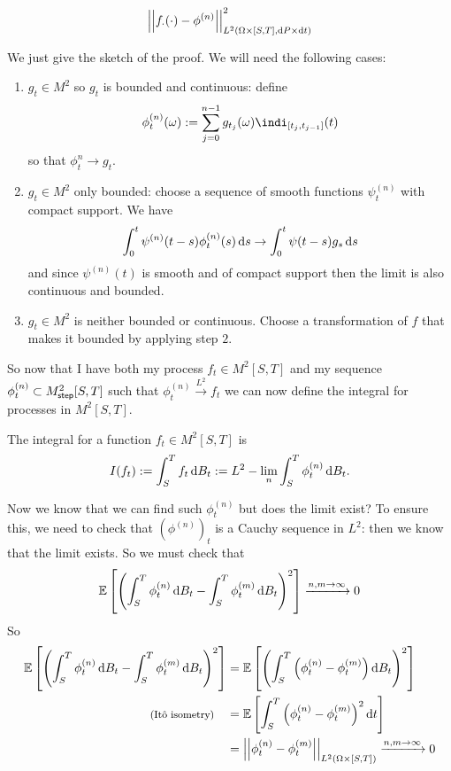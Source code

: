 \documentclass[12pt]{report}
\begin{document}
\begin{equation*}
	\norm{f_{\cdot}(\cdot)-\phi^{(n)}}^{2}_{L^{2}(\Omega\times[S,T],\dif P\times\dt)}
\end{equation*}
\begin{fancyproof}
	We just give the sketch of the proof. We will need the following cases:
	\begin{enumerate}[\circnum]
		\item $g_{t}\in M^{2}$ so $g_{t}$ is bounded and continuous: define
		\begin{equation*}
			\phi^{(n)}_{t}(\omega):=\sum_{j=0}^{n-1}g_{t_{j}}(\omega)\indi_{[t_{j},t_{j-1}]}(t)
		\end{equation*}
		so that $\phi_{t}^{n}\to g_{t}$.
		\item $g_{t}\in M^{2}$ only bounded: choose a sequence of smooth functions $\psi^{(n)}_{t}$ with compact support. We have
		\begin{equation*}
			\int_{0}^{t}\psi^{(n)}(t-s)\phi^{(n)}_{t}(s)\ds\to\int_{0}^{t}\psi(t-s)g_{s}\ds
		\end{equation*}
		and since $\psi^{(n)}(t)$ is smooth and of compact support then the limit is also continuous and bounded.
		\item $g_{t}\in M^{2}$ is neither bounded or continuous. Choose a transformation of $f$ that makes it bounded by applying step $2$.
	\end{enumerate}
\end{fancyproof}
So now that I have both my process $f_{t}\in M^{2}[S,T]$ and my sequence $\phi_{t}^{(n)}\subset\mtus[S,T]$ such that $\phi_{t}^{(n)}\xrightarrow{L^{2}}f_{t}$ we can now define the \ito{} integral for processes in $M^{2}[S,T]$.
\begin{definition}
	The \ito{} integral for a function $f_{t}\in M^{2}[S,T]$ is
	\begin{equation*}
	I(f_{t}):=	\int_{S}^{T}f_{t}\dif B_{t}:=L^{2}-\lim_{n}\int_{S}^{T}\phi^{(n)}_{t}\dbt.
	\end{equation*}
\end{definition}
Now we know that we can find such $\phi^{(n)}_{t}$ but does the limit exist? To ensure this, we need to check that ${(\phi^{(n)})}_{t}$ is a Cauchy sequence in $L^{2}$: then we know that the limit exists. So we must check that
\begin{equation*}
	\ev{\left(\int_{S}^{T}\phi^{(n)}_{t}\dbt-\int_{S}^{T}\phi^{(m)}_{t}\dbt\right)^{2}}\xrightarrow{n,m\to\infty}0
\end{equation*}
So
\begin{align*}
	\ev{\left(\int_{S}^{T}\phi^{(n)}_{t}\dbt-\int_{S}^{T}\phi^{(m)}_{t}\dbt\right)^{2}}&=\ev{\left(\int_{S}^{T}\left(\phi^{(n)}_{t}-\phi^{(m)}_{t}\right)\dbt\right)^{2}}\\
	\text{\footnotesize (\ito{} isometry)}\quad&=\ev{\int_{S}^{T}\left(\phi^{(n)}_{t}-\phi^{(m)}_{t}\right)^{2}\dt}\\
	&=\norm{\phi^{(n)}_{t}-\phi^{(m)}_{t}}_{L^{2}(\Omega\times[S,T])}\xrightarrow{n,m\to\infty}0
\end{align*}
\end{document}
